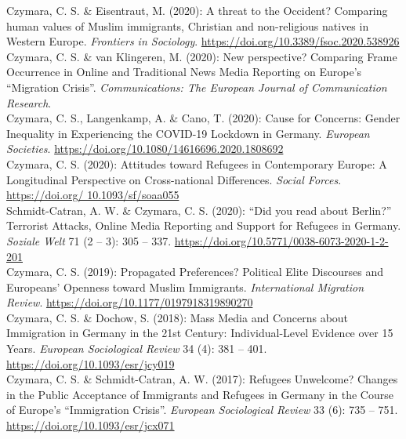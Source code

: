 \documentclass[11pt, a4paper]{article}
\newcommand{\years}[1]{\marginnote{~~#1}}
\begin{document}
\years{9}Czymara, C. S. \& Eisentraut, M. (2020): A threat to the Occident? Comparing human values of Muslim immigrants, Christian and non-religious natives in Western Europe. \textit{Frontiers in Sociology}. \href{https://doi.org/10.3389/fsoc.2020.538926}{https://doi.org/10.3389/fsoc.2020.538926}\\[1em]
\years{8}Czymara, C. S. \& van Klingeren, M. (2020): New perspective? Comparing Frame Occurrence in Online and Traditional News Media Reporting on Europe's ``Migration Crisis''. \textit{Communications: The European Journal of Communication Research}.\\[1em]
\years{7}Czymara, C. S., Langenkamp, A. \& Cano, T. (2020): Cause for Concerns: Gender Inequality in Experiencing the COVID-19 Lockdown in Germany. \textit{European Societies}. \href{https://doi.org/10.1080/14616696.2020.1808692}{https://doi.org/10.1080/14616696.2020.1808692}\\[1em]
\years{6}Czymara, C. S. (2020): Attitudes toward Refugees in Contemporary Europe: A Longitudinal Perspective on Cross-national Differences. \textit{Social Forces}. \href{https://doi.org/10.1093/sf/soaa055}{https://doi.org/ 10.1093/sf/soaa055}\\[1em]
\years{5}Schmidt-Catran, A. W. \& Czymara, C. S. (2020): ``Did you read about Berlin?'' Terrorist Attacks, Online Media Reporting and Support for Refugees in Germany. \textit{Soziale Welt} 71 (2 -- 3): 305 -- 337. \href{https://doi.org/10.5771/0038-6073-2020-1-2-201}{https://doi.org/10.5771/0038-6073-2020-1-2-201}\\[1em]
\newpage
\years{4}Czymara, C. S. (2019): Propagated Preferences? Political Elite Discourses and Europeans’ Openness toward Muslim Immigrants. \textit{International Migration Review}. \href{https://doi.org/10.1177/0197918319890270}{https://doi.org/10.1177/0197918319890270}\\[1em]
\years{3}Czymara, C. S. \& Dochow, S. (2018): Mass Media and Concerns about Immigration in Germany in the 21st Century: Individual-Level Evidence over 15 Years. \textit{European Sociological Review} 34 (4): 381 -- 401. \href{https://doi.org/10.1093/esr/jcy019}{https://doi.org/10.1093/esr/jcy019}\\[1em]
\years{2}Czymara, C. S. \& Schmidt-Catran, A. W. (2017): Refugees Unwelcome? Changes in the Public Acceptance of Immigrants and Refugees in Germany in the Course of Europe's ``Immigration Crisis''. \textit{European Sociological Review} 33 (6): 735 -- 751. \href{https://doi.org/10.1093/esr/jcx071}{https://doi.org/10.1093/esr/jcx071}
\end{document}
